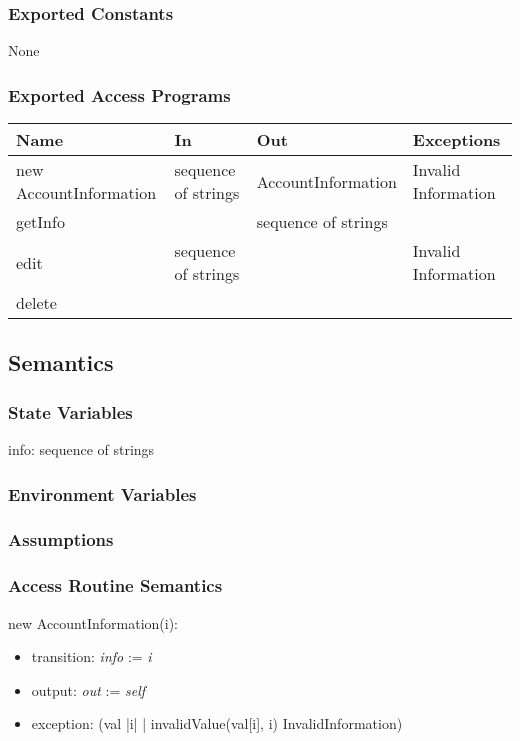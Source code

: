 \documentclass[12pt, titlepage]{article}
\begin{document}
\subsubsection{Exported Constants}

None

\subsubsection{Exported Access Programs}

\begin{center}
\begin{tabular}{p{4cm} p{3cm} p{3cm} p{2cm}}
\hline
\textbf{Name} & \textbf{In} & \textbf{Out} & \textbf{Exceptions} \\
\hline
new AccountInformation & sequence of strings & AccountInformation & Invalid Information \\
getInfo & & sequence of strings & \\
edit & sequence of strings & & Invalid Information \\
delete & & & \\
\hline
\end{tabular}
\end{center}

\subsection{Semantics}

\subsubsection{State Variables}

info: sequence of strings

\subsubsection{Environment Variables}

\subsubsection{Assumptions}

\subsubsection{Access Routine Semantics}

\noindent new AccountInformation(i):
\begin{itemize}
\item transition: \textit{info} := \textit{i}
\item output: \textit{out} := \textit{self}
\item exception: (\forall val \in |i| | invalidValue(val[i], i) \Rightarrow InvalidInformation)
\end{itemize}
\end{document}
